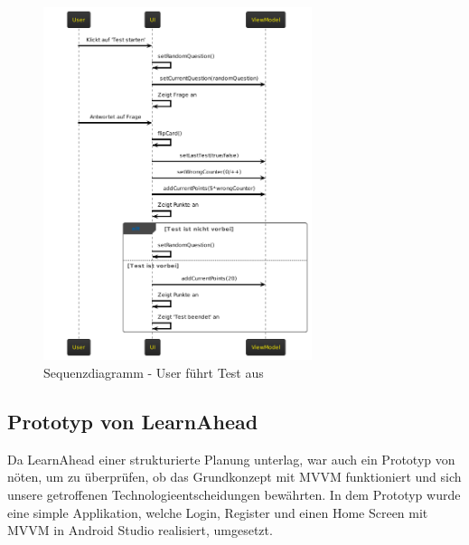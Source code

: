 \begin{figure}[H]
    \centering
    \includegraphics[width=0.7\textwidth]{images/diagramme/sequenzdiagramme/user_fuehrt_test_aus.png}
    \caption{Sequenzdiagramm - User führt Test aus}
    \label{fig:sequenz_user_fuehrt_test}
\end{figure} 
\newpage
\subsection{Prototyp von LearnAhead}
Da LearnAhead einer strukturierte Planung unterlag, war auch ein Prototyp von nöten, um zu überprüfen, ob das Grundkonzept mit MVVM funktioniert und sich unsere getroffenen Technologieentscheidungen bewährten. \newline
In dem Prototyp wurde eine simple Applikation, welche Login, Register und einen Home Screen mit MVVM in Android Studio realisiert, umgesetzt. \newline